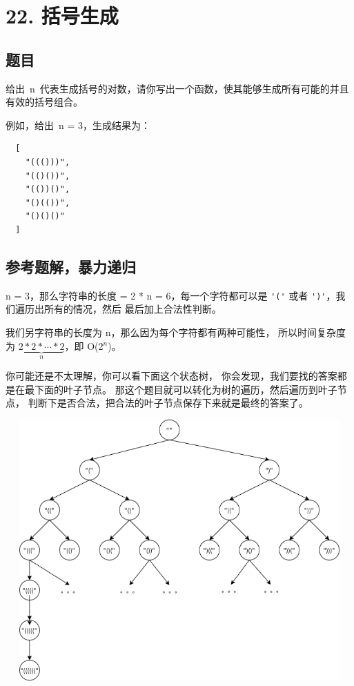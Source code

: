 \newpage
\section{22. 括号生成}
\label{leetcode:22}

\subsection{题目}

给出 n 代表生成括号的对数，请你写出一个函数，使其能够生成所有可能的并且有效的括号组合。

例如，给出 n = 3，生成结果为：

\begin{verbatim}
  [
    "((()))",
    "(()())",
    "(())()",
    "()(())",
    "()()()"
  ]
\end{verbatim}

\subsection{参考题解，暴力递归}

n = 3，那么字符串的长度 = 2 * n = 6，每一个字符都可以是
\verb|'('| 或者 \verb|')'|，我们遍历出所有的情况，然后
最后加上合法性判断。

我们另字符串的长度为 n，那么因为每个字符都有两种可能性，
所以时间复杂度为 $\underbrace{2*2*\cdots*2}_{n}$，即 O(2$^{n}$)。

你可能还是不太理解，你可以看下面这个状态树，
你会发现，我们要找的答案都是在最下面的叶子节点。
那这个题目就可以转化为树的遍历，然后遍历到叶子节点，
判断下是否合法，把合法的叶子节点保存下来就是最终的答案了。

\includegraphics[width=150mm,height=100mm]{images/leetcode/leetcode_22.png}

